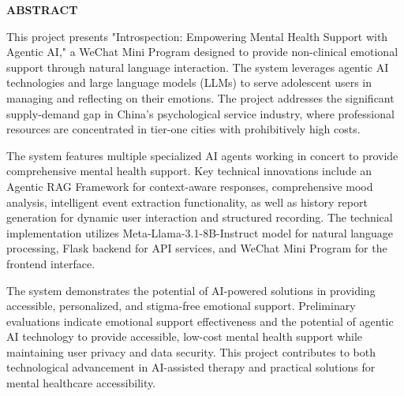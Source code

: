\begin{center}
    \vspace*{2cm}
    {\Large \textbf{ABSTRACT}}\\[1cm]
\end{center}

This project presents "Introspection: Empowering Mental Health Support with Agentic AI," a WeChat Mini Program designed to provide non-clinical emotional support through natural language interaction. The system leverages agentic AI technologies and large language models (LLMs) to serve adolescent users in managing and reflecting on their emotions. The project addresses the significant supply-demand gap in China's psychological service industry, where professional resources are concentrated in tier-one cities with prohibitively high costs.

The system features multiple specialized AI agents working in concert to provide comprehensive mental health support. Key technical innovations include an Agentic RAG Framework for context-aware responses, comprehensive mood analysis, intelligent event extraction functionality, as well as history report generation for dynamic user interaction and structured recording. The technical implementation utilizes Meta-Llama-3.1-8B-Instruct model for natural language processing, Flask backend for API services, and WeChat Mini Program for the frontend interface. 

The system demonstrates the potential of AI-powered solutions in providing accessible, personalized, and stigma-free emotional support. Preliminary evaluations indicate emotional support effectiveness and the potential of agentic AI technology to provide accessible, low-cost mental health support while maintaining user privacy and data security. This project contributes to both technological advancement in AI-assisted therapy and practical solutions for mental healthcare accessibility.

\newpage 